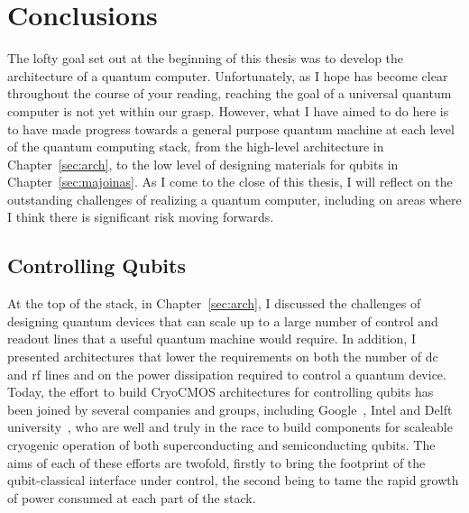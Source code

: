 \chapter{Conclusions}


The lofty goal set out at the beginning of this thesis was to develop the architecture of a quantum computer. Unfortunately,
as I hope has become clear throughout the course of your reading, reaching the goal of a universal quantum computer
is not yet within our grasp. However, what I have aimed to do here is to have made progress towards a general purpose quantum machine at each
level of the quantum computing stack, from the high-level architecture in Chapter~\ref{sec:arch}, to the low level
of designing materials for qubits in Chapter~\ref{sec:majoinas}. As I come to the close of this thesis, I will reflect on the outstanding
challenges of realizing a quantum computer, including on areas where I think there is significant risk moving forwards.

\section{Controlling Qubits}
At the top of the stack, in Chapter~\ref{sec:arch}, I discussed the challenges of designing quantum devices that can scale up to a large number of
control and readout lines that a useful quantum machine would require. In addition, I presented architectures that lower the
requirements on both the number of dc and rf lines and on the power dissipation required to control a quantum device. Today, the effort to build
CryoCMOS architectures for controlling qubits has been joined by several companies and groups, including Google~\cite{gcryocmos}, Intel and Delft university~\cite{VANDIJK201990},
who are well and truly in the race to build components for scaleable cryogenic operation of both superconducting and semiconducting qubits. The aims of each
of these efforts are twofold, firstly to bring the footprint of the qubit-classical interface under control, the second being
to tame the rapid growth of power consumed at each part of the stack.

